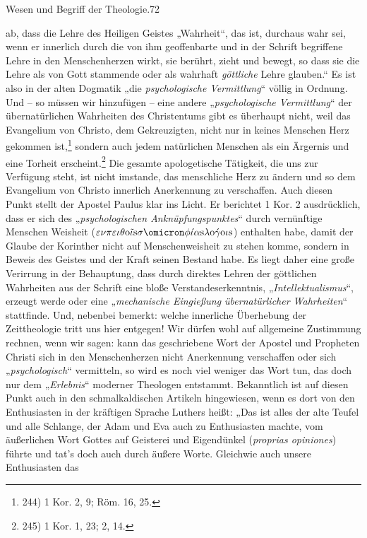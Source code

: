 \noindent Wesen und Begriff der Theologie.\hfill 72\par\nZeugnis ab, dass die Lehre des Heiligen Geistes „Wahrheit“, das ist, durchaus wahr sei, wenn er innerlich durch die von ihm geoffenbarte und in der Schrift begriffene Lehre in den Menschenherzen wirkt, sie berührt, zieht und bewegt, so dass sie die Lehre als von Gott stammende oder als wahrhaft \emph{göttliche} Lehre glauben.“ Es ist also in der alten Dogmatik „die \emph{psychologische Vermittlung}“ völlig in Ordnung. Und – so müssen wir hinzufügen – eine andere „\emph{psychologische Vermittlung}“ der übernatürlichen Wahrheiten des Christentums gibt es überhaupt nicht, weil das Evangelium von Christo, dem Gekreuzigten, nicht nur in keines Menschen Herz gekommen ist,\footnote{244) 1 Kor. 2, 9; Röm. 16, 25.} sondern auch jedem natürlichen Menschen als ein Ärgernis und eine Torheit erscheint.\footnote{245) 1 Kor. 1, 23; 2, 14.} Die gesamte apologetische Tätigkeit, die uns zur Verfügung steht, ist nicht imstande, das menschliche Herz zu ändern und so dem Evangelium von Christo innerlich Anerkennung zu verschaffen. Auch diesen Punkt stellt der Apostel Paulus klar ins Licht. Er berichtet 1 Kor. 2 ausdrücklich, dass er sich des „\emph{psychologischen Anknüpfungspunktes}“ durch vernünftige Menschen Weisheit ($\varepsilon\nu \pi \varepsilon \iota \theta \text{o}\tilde{\iota}\text{s} \sigma \omicron \phi \acute{\iota}\alpha \text{s} \lambda \text{o}\acute{\gamma}\text{o}\iota\text{s}$) enthalten habe, damit der Glaube der Korinther nicht auf Menschenweisheit zu stehen komme, sondern in Beweis des Geistes und der Kraft seinen Bestand habe. Es liegt daher eine große Verirrung in der Behauptung, dass durch direktes Lehren der göttlichen Wahrheiten aus der Schrift eine bloße Verstandeserkenntnis, „\emph{Intellektualismus}“, erzeugt werde oder eine „\emph{mechanische Eingießung übernatürlicher Wahrheiten}“ stattfinde. Und, nebenbei bemerkt: welche innerliche Überhebung der Zeittheologie tritt uns hier entgegen! Wir dürfen wohl auf allgemeine Zustimmung rechnen, wenn wir sagen: kann das geschriebene Wort der Apostel und Propheten Christi sich in den Menschenherzen nicht Anerkennung verschaffen oder sich „\emph{psychologisch}“ vermitteln, so wird es noch viel weniger das Wort tun, das doch nur dem „\emph{Erlebnis}“ moderner Theologen entstammt. Bekanntlich ist auf diesen Punkt auch in den schmalkaldischen Artikeln hingewiesen, wenn es dort von den Enthusiasten in der kräftigen Sprache Luthers heißt: „Das ist alles der alte Teufel und alle Schlange, der Adam und Eva auch zu Enthusiasten machte, vom äußerlichen Wort Gottes auf Geisterei und Eigendünkel (\emph{proprias opiniones}) führte und tat's doch auch durch äußere Worte. Gleichwie auch unsere Enthusiasten das